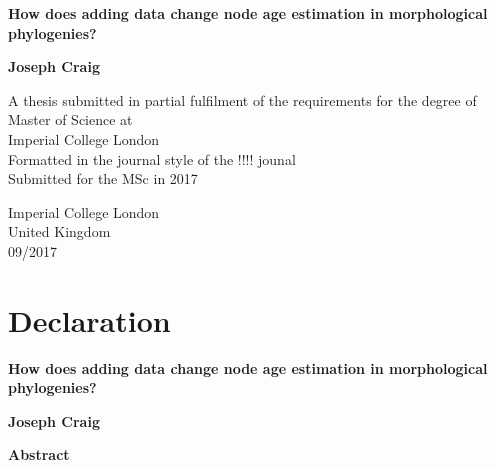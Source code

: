\documentclass[11pt,letterpaper]{article}
\begin{document}
    \begin{center}
        \vspace*{1cm}
        
        \large
        \textbf{How does adding data change node age estimation in morphological phylogenies?}
        
        
        \vspace{1.5cm}
        
        \textbf{Joseph Craig}
        
        \vspace{6cm}
        
        \Large
        A thesis submitted in partial fulfilment of the requirements for the degree of Master of Science at\\
        Imperial College London\\
        Formatted in the journal style of the !!!! jounal\\
        Submitted for the MSc in 2017\\
        
        \vspace{1.0cm}
                
        \Large
        Imperial College London\\
        United Kingdom\\
        09/2017\\
        
    \end{center}

\newpage

\section*{Declaration}

\newpage


\thispagestyle{plain}
\begin{center}
	\large
	\textbf{How does adding data change node age estimation in morphological phylogenies?}

	\vspace{0.4cm}
	\textbf{Joseph Craig}

	\vspace{0.9cm}
	\textbf{Abstract}
\end{center}
\end{document}
